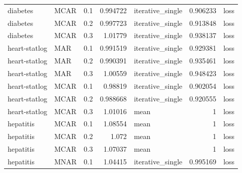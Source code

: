 \begin{table}[ht]
{\begin{tabular}{llrrlrl}
 diabetes             & MCAR        &         0.1 &                          0.994722 & iterative\_single &                           0.906233 & loss                 \\
 diabetes             & MCAR        &         0.2 &                          0.997723 & iterative\_single &                           0.913848 & loss                 \\
 diabetes             & MCAR        &         0.3 &                          1.01779  & iterative\_single &                           0.938137 & loss                 \\
 heart-statlog        & MAR         &         0.1 &                          0.991519 & iterative\_single &                           0.929381 & loss                 \\
 heart-statlog        & MAR         &         0.2 &                          0.990391 & iterative\_single &                           0.935461 & loss                 \\
 heart-statlog        & MAR         &         0.3 &                          1.00559  & iterative\_single &                           0.948423 & loss                 \\
 heart-statlog        & MCAR        &         0.1 &                          0.98819  & iterative\_single &                           0.902054 & loss                 \\
 heart-statlog        & MCAR        &         0.2 &                          0.988668 & iterative\_single &                           0.920555 & loss                 \\
 heart-statlog        & MCAR        &         0.3 &                          1.01016  & mean             &                           1        & loss                 \\
 hepatitis            & MCAR        &         0.1 &                          1.08554  & mean             &                           1        & loss                 \\
 hepatitis            & MCAR        &         0.2 &                          1.072    & mean             &                           1        & loss                 \\
 hepatitis            & MCAR        &         0.3 &                          1.07037  & mean             &                           1        & loss                 \\
 hepatitis            & MNAR        &         0.1 &                          1.04415  & iterative\_single &                           0.995169 & loss                 \\

\end{tabular}}
\end{table}
